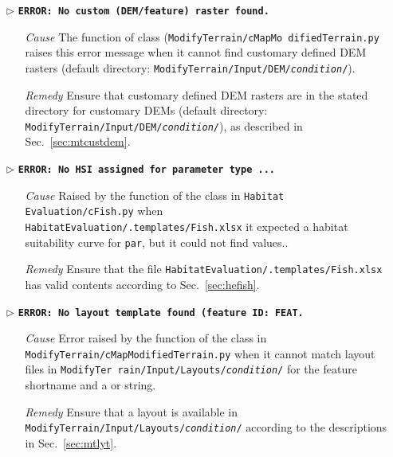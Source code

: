 \begin{itemize}
	\item[$\triangleright$]\textbf{\texttt{ERROR: No custom (DEM/feature) raster found.}}
	\begin{itemize}
		\item[\textit{Cause}\hspace{0.27cm}] The  function of  class (\texttt{ModifyTerrain/cMapMo difiedTerrain.py} raises this error message when it cannot find customary defined DEM rasters (default directory: \texttt{ModifyTerrain/Input/DEM/\textit{condition}/}).
		\item[\textit{Remedy}] Ensure that customary defined DEM rasters are in the stated directory for customary DEMs (default directory: \texttt{ModifyTerrain/Input/DEM/\textit{condition}/}), as described in Sec.~\ref{sec:mtcustdem}.\\
	\end{itemize}
		
	\item[$\triangleright$]\textbf{\texttt{ERROR: No HSI assigned for parameter type ...}}
	\begin{itemize}
		\item[\textit{Cause}\hspace{0.27cm}] Raised by the  function of the  class in \texttt{Habitat Evaluation/cFish.py} when \\ \texttt{HabitatEvaluation/.templates/Fish.xlsx} it expected a habitat suitability curve for \texttt{par}, but it could not find values..
		\item[\textit{Remedy}] Ensure that the file \texttt{HabitatEvaluation/.templates/Fish.xlsx} has valid contents according to Sec.~\ref{sec:hefish}.\\
	\end{itemize}	
	
	\item[$\triangleright$]\textbf{\texttt{ERROR: No layout template found (feature ID: FEAT.}}
	\begin{itemize}
		\item[\textit{Cause}\hspace{0.27cm}] Error raised by the  function of the  class in \texttt{ModifyTerrain/cMapModifiedTerrain.py} when it cannot match layout files in \texttt{ModifyTer rain/Input/Layouts/\textit{condition}/} for the feature shortname  and a  or  string.
		\item[\textit{Remedy}] Ensure that a layout is available in \texttt{ModifyTerrain/Input/Layouts/\textit{condition}/} according to the descriptions in Sec.~\ref{sec:mtlyt}.\\
	\end{itemize}
	

\end{itemize}
